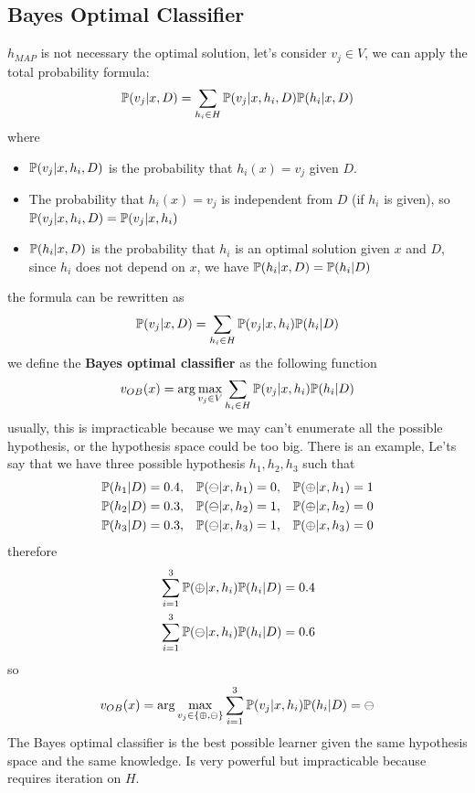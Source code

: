 \documentclass[10pt, letterpaper]{report}
\begin{document}
\subsection{Bayes Optimal Classifier}
$h_{MAP}$ is not necessary the optimal solution, let's consider $v_j\in V$, we can apply the total probability formula:\begin{equation}
	{\mathbb P}(v_j|x,D)=\sum_{h_i\in H}{\mathbb P}(v_j|x,h_i,D){\mathbb P}(h_i|x,D)
\end{equation}
where \begin{itemize}
	\item ${\mathbb P}(v_j|x,h_i,D)$ is the probability that $h_i(x)=v_j$ given $D$.
	\item The probability that  $h_i(x)=v_j$ is independent from $D$ (if $h_i$ is given), so ${\mathbb P}(v_j|x,h_i,D)={\mathbb P}(v_j|x,h_i)$
	\item ${\mathbb P}(h_i|x,D)$ is the probability that $h_i$ is an optimal solution given $x$ and $D$, since $h_i$ does not depend on $x$, we have ${\mathbb P}(h_i|x,D)={\mathbb P}(h_i|D)$
\end{itemize}
the formula can be rewritten as\begin{equation}
	{\mathbb P}(v_j|x,D)=\sum_{h_i\in H}{\mathbb P}(v_j|x,h_i){\mathbb P}(h_i|D)
\end{equation}
we define the \textbf{Bayes optimal classifier} as the following function\begin{equation}
	v_{OB}(x)=\arg\max_{v_j\in V}\sum_{h_i\in H}{\mathbb P}(v_j|x,h_i){\mathbb P}(h_i|D)
\end{equation}
usually, this is impracticable because we may can't enumerate all the possible hypothesis, or the hypothesis space could be too big. There is an example, Le'ts say that we have three possible hypothesis $h_1,h_2,h_3$ such that
\begin{align*}
	{\mathbb P}(h_1|D) & = 0.4, & {\mathbb P}(\ominus|x, h_1) & = 0, & {\mathbb P}(\oplus|x, h_1) & = 1 \\
	{\mathbb P}(h_2|D) & = 0.3, & {\mathbb P}(\ominus|x, h_2) & = 1, & {\mathbb P}(\oplus|x, h_2) & = 0 \\
	{\mathbb P}(h_3|D) & = 0.3, & {\mathbb P}(\ominus|x, h_3) & = 1, & {\mathbb P}(\oplus|x, h_3) & = 0
\end{align*}
therefore\begin{align*}
	 & \sum_{i=1}^3{\mathbb P}(\oplus|x,h_i){\mathbb P}(h_i|D)=0.4  \\
	 & \sum_{i=1}^3{\mathbb P}(\ominus|x,h_i){\mathbb P}(h_i|D)=0.6
\end{align*}
so\begin{equation}
	v_{OB}(x)=\arg\max_{v_j\in\{\oplus,\ominus\}}\sum_{i=1}^3{\mathbb P}(v_j|x,h_i){\mathbb P}(h_i|D)=\ominus
\end{equation}
The Bayes optimal classifier is the best possible learner given the same hypothesis space and the same knowledge. Is very powerful but impracticable because requires iteration on $H$.\bigskip
\end{document}

